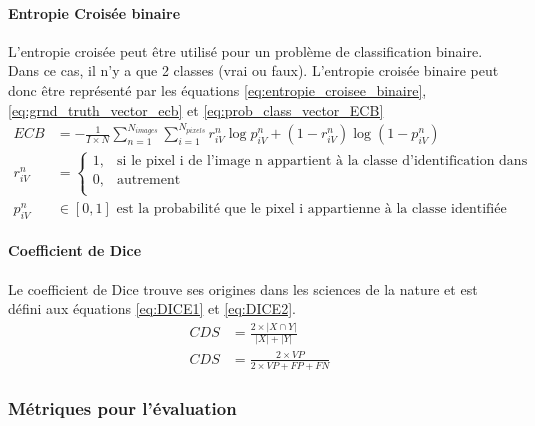       \paragraph{Entropie Croisée binaire} L'entropie croisée peut être utilisé pour un problème de classification binaire. Dans ce cas, il n'y a que 2 classes (vrai ou faux). L'entropie croisée binaire peut donc être représenté par les équations \ref{eq:entropie_croisee_binaire}, \ref{eq:grnd_truth_vector_ecb} et \ref{eq:prob_class_vector_ECB}
      \begin{align}
        ECB & = -\frac{1}{I \times N} \sum_{n=1}^{N_{images}}\sum_{i=1}^{N_{pixels}}r^{n}_{iV} \log{p^{n}_{iV}} +
        (1-r^{n}_{iV}) \log{(1-p^{n}_{iV})} \label{eq:entropie_croisee_binaire}\\
        r^{n}_{iV} & = \begin{cases}
          1,& \mbox{si le pixel i de l'image n appartient à la classe d'identification dans l'annotation d'entrainement}\\
          0,& \mbox{autrement}\\ \end{cases}\label{eq:grnd_truth_vector_ecb}\\
        p^{n}_{iV} & \in [0,1]\mbox{ est la probabilité que le pixel i appartienne à la classe identifiée}\label{eq:prob_class_vector_ECB}
      \end{align}
      \paragraph{Coefficient de Dice} 
      Le coefficient de Dice trouve ses origines dans les sciences de la nature \parencite{Dice:MeasuresAmount:1945} et est défini aux équations \ref{eq:DICE1} et \ref{eq:DICE2}.
      \begin{align} 
        CDS & = \frac{2 \times \lvert X \cap Y \rvert}{\lvert X \rvert + \lvert Y \rvert}\label{eq:DICE1} \\
        CDS & = \frac{2 \times VP}{2 \times VP + FP + FN}\label{eq:DICE2}
      \end{align}
    \subsubsection{Métriques pour l'évaluation}
